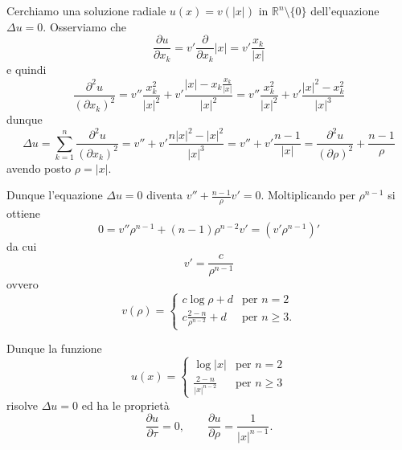 \documentclass[italian,a4paper,oneside,headinclude]{scrbook}
\newcommand{\RR}{\mathbb R}
\newcommand{\abs}[1]{{\left|#1\right|}}
\begin{document}
Cerchiamo una soluzione radiale $u(x)=v(\abs{x})$ in
$\RR^n\setminus\{0\}$ dell'equazione $\Delta u = 0$.
\cite[4.8 A pag. 86]{Vladimirov}
Osserviamo che
\[
\frac{\partial u}{\partial x_k} = v' \frac{\partial}{\partial x_k}\abs{x} = v' \frac{x_k}{\abs{x}}
\]
e quindi
\[
\frac{\partial^2 u}{(\partial x_k)^2}
= v'' \frac{x_k^2}{\abs{x}^2} + v' \frac{\abs{x}-x_k\frac{x_k}{\abs{x}}}{\abs{x}^2}
= v'' \frac{x_k^2}{\abs{x}^2} + v' \frac{\abs{x}^2-x_k^2}{\abs{x}^3}
\]
dunque
\[
\Delta u
= \sum_{k=1}^n \frac{\partial^2 u}{(\partial x_k)^2}
= v'' + v' \frac{n\abs{x}^2-\abs{x}^2}{\abs{x}^3}
= v'' + v' \frac{n-1}{\abs{x}}
= \frac{\partial^2 u}{(\partial \rho)^2} + \frac{n-1}{\rho}
\]
avendo posto $\rho=\abs{x}$.

Dunque l'equazione $\Delta u = 0$ diventa $v'' + \frac{n-1}{\rho} v' = 0$. Moltiplicando per $\rho^{n-1}$ si ottiene
\[
0 = v'' \rho^{n-1} + (n-1) \rho^{n-2} v' = (v' \rho^{n-1})'
\]
da cui
\[
v' = \frac{c}{\rho^{n-1}}
\]
ovvero
\[
v(\rho) =
\begin{cases}
  c\log \rho + d & \text{per $n=2$}\\
  c\frac{2-n}{\rho^{n-2}} + d & \text{per $n\ge 3$}.
\end{cases}
\]

Dunque la funzione
\[
u(x) =
\begin{cases}
  \log \abs{x} & \text{per $n=2$}\\
  \frac{2-n}{\abs{x}^{n-2}} & \text{per $n\ge 3$}
\end{cases}
\]
risolve $\Delta u=0$ ed ha le proprietà
\[
\frac{\partial u}{\partial \tau} = 0,
\qquad
\frac{\partial u}{\partial \rho} = \frac{1}{\abs{x}^{n-1}}.
\]
\end{document}
